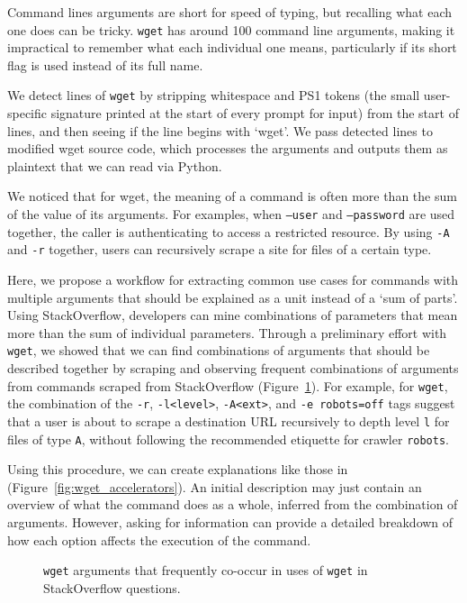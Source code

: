 Command lines arguments are short for speed of typing, but recalling what each one does can be tricky.
\texttt{wget} has around 100 command line arguments, making it impractical to remember what each individual one means, particularly if its short flag is used instead of its full name.

We detect lines of \texttt{wget} by stripping whitespace and PS1 tokens (the small user-specific signature printed at the start of every prompt for input) from the start of lines, and then seeing if the line begins with `wget'.
We pass detected lines to modified wget source code, which processes the arguments and outputs them as plaintext that we can read via Python.

We noticed that for wget, the meaning of a command is often more than the sum of the value of its arguments.
For examples, when \texttt{--user} and \texttt{--password} are used together, the caller is authenticating to access a restricted resource.
By using \texttt{-A} and \texttt{-r} together, users can recursively scrape a site for files of a certain type.

Here, we propose a workflow for extracting common use cases for commands with multiple arguments that should be explained as a unit instead of a `sum of parts'.
Using StackOverflow, developers can mine combinations of parameters that mean more than the sum of individual parameters.
Through a preliminary effort with \texttt{wget}, we showed that we can find combinations of arguments that should be described together by scraping and observing frequent combinations of arguments from commands scraped from StackOverflow (Figure~\ref{fig:wget_arguments}).
For example, for \texttt{wget}, the combination of the \texttt{-r}, \texttt{-l<level>}, \texttt{-A<ext>}, and \texttt{-e robots=off} tags suggest that a user is about to scrape a destination URL recursively to depth level \texttt{l} for files of type \texttt{A}, without following the recommended etiquette for crawler \texttt{robots}.

Using this procedure, we can create explanations like those in (Figure~\ref{fig:wget_accelerators}).
An initial description may just contain an overview of what the command does as a whole, inferred from the combination of arguments.
However, asking for information can provide a detailed breakdown of how each option affects the execution of the command.

\begin{figure}
\caption{\texttt{wget} arguments that frequently co-occur in uses of \texttt{wget} in StackOverflow questions. }
\label{fig:wget_arguments}
\end{figure}
